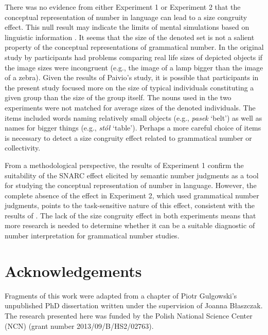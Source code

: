 \documentclass[output=paper]{langscibook}
\begin{document}
There was no evidence from either Experiment 1 or Experiment 2 that the conceptual representation of number in language can lead to a size congruity effect. This null result may indicate the limits of mental simulations based on linguistic information  \citep{barsalouPerceptualSymbolSystems1999,zwaanMentalSimulationLanguage2009,patsonConceptualRepresentationNumber2014}. It seems that the size of the denoted set is not a salient property of the conceptual representations of grammatical number. In the original study by \citet{paivioPerceptualComparisonsMind1975} participants had problems comparing real life sizes of depicted objects if the image sizes were incongruent (e.g., the image of a lamp bigger than the image of a zebra). Given the results of Paivio's study, it is possible that participants in the present study focused more on the size of typical individuals constituting a given group than the size of the group itself. The nouns used in the two experiments were not matched for average sizes of the denoted individuals. The items included words naming relatively small objects (e.g., \textit{pasek} ‘belt’) as well as names for bigger things (e.g., \textit{stół} ‘table’). Perhaps a more careful choice of items is necessary to detect a size congruity effect related to grammatical number or collectivity.

From a methodological perspective, the results of Experiment 1 confirm the suitability of the SNARC effect elicited by semantic number judgments as a tool for studying the conceptual representation of number in language. However, the complete absence of the effect in Experiment 2, which used grammatical number judgments, points to the task-sensitive nature of this effect, consistent with the results of \citet{rottgerGrammaticalNumberElicits2015}. The lack of the size congruity effect in both experiments means that more research is needed to determine whether it can be a suitable diagnostic of number interpretation for grammatical number studies.

\section*{Acknowledgements}
Fragments of this work were adapted from a chapter of Piotr Gulgowski’s unpublished PhD dissertation written under the supervision of Joanna Błaszczak. The research presented here was funded by the Polish National Science Center (NCN) (grant number 2013/09/B/HS2/02763).

{\sloppy\printbibliography[heading=subbibliography,notkeyword=this]}
\end{document}
